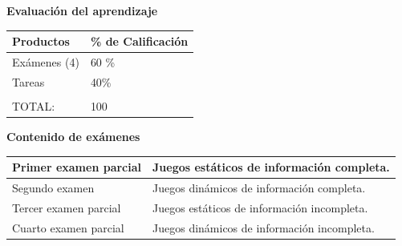 \documentclass[11pt]{article}
\begin{document}
\textbf{Evaluación del aprendizaje}

\begin{table}[ht]
	\centering
	\begin{tabular}{|l|l|}
		\hline
		\rowcolor[HTML]{D9D9D9} 
		Productos     & \% de Calificación \\ \hline
		Exámenes (4)  & 60 \% \\ \hline
		Tareas        & 40\%  \\ \hline
		&                                                                 \\
		TOTAL:        & 100\\
		\hline                              
	\end{tabular}
\end{table}

\textbf{Contenido de exámenes}

\begin{table}[ht]
\centering
\begin{tabular}{|l|l|}
	\hline
	Primer examen parcial & Juegos estáticos de información completa.   \\ \hline
	Segundo examen        & Juegos dinámicos de información completa.  \\ \hline
	Tercer examen parcial & Juegos estáticos de información incompleta. \\ \hline
	Cuarto examen parcial & Juegos dinámicos de información incompleta. \\ \hline           
\end{tabular}
\end{table}

%
%
%
\end{document}
